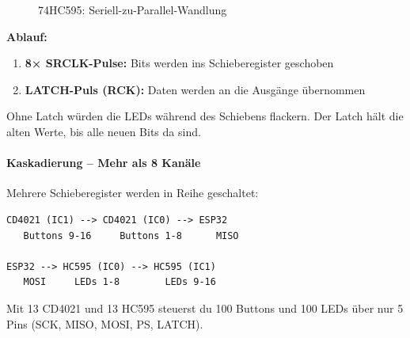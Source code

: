 \begin{figure}[htbp]
\centering
{}
\caption{74HC595: Seriell-zu-Parallel-Wandlung}
\label{fig:hc595}
\end{figure}

\textbf{Ablauf:}
\begin{enumerate}
\item \textbf{8× SRCLK-Pulse:} Bits werden ins Schieberegister geschoben
\item \textbf{LATCH-Puls (RCK):} Daten werden an die Ausgänge übernommen
\end{enumerate}

\begin{infobox}
Ohne Latch würden die LEDs während des Schiebens flackern. Der Latch hält die alten Werte, bis alle neuen Bits da sind.
\end{infobox}

\paragraph{Kaskadierung – Mehr als 8 Kanäle}

Mehrere Schieberegister werden in Reihe geschaltet:

\begin{lstlisting}[style=wrap,numbers=none]
CD4021 (IC1) --> CD4021 (IC0) --> ESP32
   Buttons 9-16     Buttons 1-8      MISO

ESP32 --> HC595 (IC0) --> HC595 (IC1)
   MOSI     LEDs 1-8        LEDs 9-16
\end{lstlisting}

\begin{tipbox}[Konsequenz]
Mit 13 CD4021 und 13 HC595 steuerst du 100 Buttons und 100 LEDs über nur 5 Pins (SCK, MISO, MOSI, PS, LATCH).
\end{tipbox}

